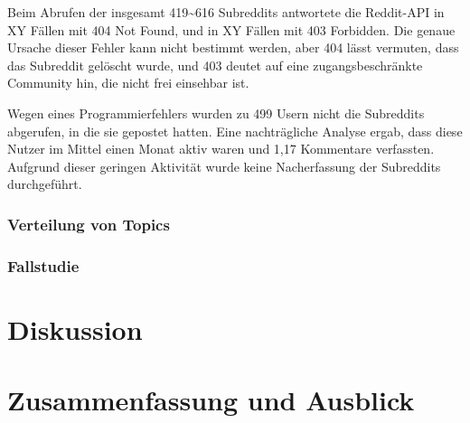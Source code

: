 \documentclass[11pt,a4paper,twoside]{article}
\let\oldpb\printbibliography
\renewcommand{\printbibliography}{\oldpb[heading=bibintoc]}
\begin{document}
Beim Abrufen der insgesamt 419\textasciitilde{}616 Subreddits antwortete
die Reddit-API in XY Fällen mit \glqq{}404 Not Found\grqq{}, und in XY
Fällen mit \glqq{}403 Forbidden\grqq{}. Die genaue Ursache dieser Fehler
kann nicht bestimmt werden, aber 404 lässt vermuten, dass das Subreddit
gelöscht wurde, und 403 deutet auf eine zugangsbeschränkte Community
hin, die nicht frei einsehbar ist.

Wegen eines Programmierfehlers wurden zu 499 Usern nicht die Subreddits
abgerufen, in die sie gepostet hatten. Eine nachträgliche Analyse ergab,
dass diese Nutzer im Mittel einen Monat aktiv waren und 1,17 Kommentare
verfassten. Aufgrund dieser geringen Aktivität wurde keine Nacherfassung
der Subreddits durchgeführt.

\hypertarget{verteilung-von-topics}{%
\subsubsection{Verteilung von Topics}\label{verteilung-von-topics}}

\hypertarget{fallstudie}{%
\subsubsection{Fallstudie}\label{fallstudie}}

\cleardoublepage

\hypertarget{diskussion}{%
\section{Diskussion}\label{diskussion}}

\cleardoublepage

\hypertarget{zusammenfassung-und-ausblick}{%
\section{Zusammenfassung und
Ausblick}\label{zusammenfassung-und-ausblick}}

\printbibliography
\end{document}

